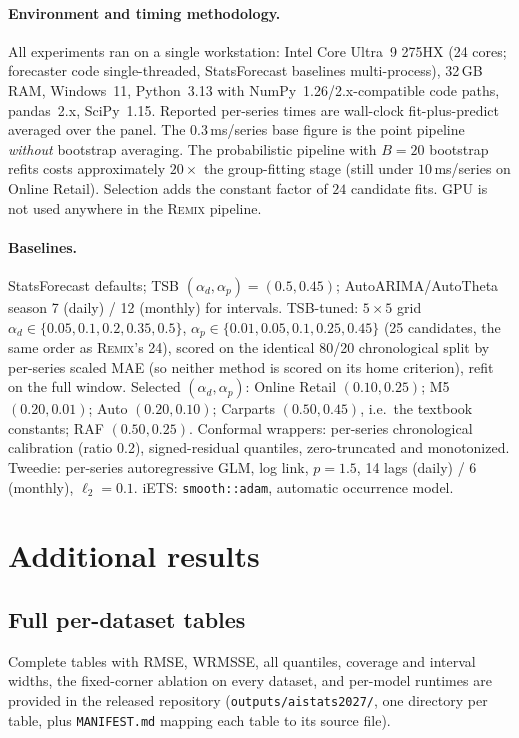 \documentclass[twocolumn,10pt]{article}
\newcommand{\REMIX}{\textsc{Remix}}
\begin{document}
\paragraph{Environment and timing methodology.} All experiments ran on a
single workstation: Intel Core Ultra~9 275HX (24 cores; forecaster code
single-threaded, StatsForecast baselines multi-process), 32\,GB RAM,
Windows~11, Python~3.13 with NumPy~1.26/2.x-compatible code paths,
pandas~2.x, SciPy~1.15. Reported per-series times are wall-clock
fit-plus-predict averaged over the panel. The $0.3$\,ms/series base
figure is the point pipeline \emph{without} bootstrap averaging. The
probabilistic pipeline with $B{=}20$ bootstrap refits costs
approximately $20\times$ the group-fitting stage (still under
$10$\,ms/series on Online Retail). Selection adds the constant factor of
$24$ candidate fits. GPU is not used anywhere in the \REMIX{} pipeline.

\paragraph{Baselines.} StatsForecast defaults; TSB
$(\alpha_d,\alpha_p)=(0.5,0.45)$; AutoARIMA/AutoTheta season 7 (daily) /
12 (monthly) for intervals. TSB-tuned: $5\times5$ grid
$\alpha_d\in\{0.05,0.1,0.2,0.35,0.5\}$,
$\alpha_p\in\{0.01,0.05,0.1,0.25,0.45\}$ (25 candidates, the same order
as \REMIX{}'s 24), scored on the identical 80/20 chronological split by
per-series scaled MAE (so neither method is scored on its home
criterion), refit on the full window. Selected $(\alpha_d,\alpha_p)$:
Online Retail $(0.10,0.25)$; M5 $(0.20,0.01)$; Auto $(0.20,0.10)$;
Carparts $(0.50,0.45)$, i.e.\ the textbook constants; RAF
$(0.50,0.25)$. Conformal wrappers: per-series chronological
calibration (ratio 0.2), signed-residual quantiles, zero-truncated and
monotonized. Tweedie: per-series autoregressive GLM, log link, $p{=}1.5$,
14 lags (daily) / 6 (monthly), $\ell_2{=}0.1$. iETS:
\texttt{smooth::adam}, automatic occurrence model.

\section{Additional results}\label{app:extra}

\subsection{Full per-dataset tables}
Complete tables with RMSE, WRMSSE, all quantiles, coverage and interval
widths, the fixed-corner ablation on every dataset, and per-model
runtimes are provided in the released repository
(\texttt{outputs/aistats2027/}, one directory per table, plus
\texttt{MANIFEST.md} mapping each table to its source file).
\end{document}

